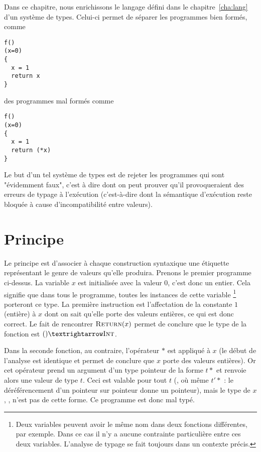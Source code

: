 Dans ce chapitre, nous enrichissons le langage défini dans le
chapitre~\ref{cha:lang} d'un système de types. Celui-ci permet de séparer les
programmes bien formés, comme

\begin{Verbatim}
f()
(x=0)
{
  x = 1
  return x
}
\end{Verbatim}

des programmes mal formés comme

\begin{Verbatim}
f()
(x=0)
{
  x = 1
  return (*x)
}
\end{Verbatim}

Le but d'un tel système de types est de rejeter les programmes qui sont
"évidemment faux", c'est à dire dont on peut prouver qu'il provoqueraient des
erreurs de typage à l'exécution (c'est-à-dire dont la sémantique d'exécution
reste bloquée à cause d'incompatibilité entre valeurs).

\section{Principe}

Le principe est d'associer à chaque construction syntaxique une étiquette
représentant le genre de valeurs qu'elle produira. Prenons le premier programme
ci-dessus. La variable $x$ est initialisée avec la valeur $0$, c'est donc un
entier. Cela signifie que dans tous le programme, toutes les instances de cette
variable
\footnote{Deux variables peuvent avoir le même nom dans deux fonctions
  différentes, par exemple. Dans ce cas il n'y a aucune contrainte particulière
  entre ces deux variables. L'analyse de typage se fait toujours dans un
  contexte précis.
}
porteront ce type. La première instruction est l'affectation de la constante $1$
(entière) à $x$ dont on sait qu'elle porte des valeurs entières, ce qui est donc
correct. Le fait de rencontrer $\textsc{Return}(x)$ permet de conclure que le type de
la fonction est $() → \tInt$.

Dans la seconde fonction, au contraire, l'opérateur $*$ est appliqué à $x$ (le
début de l'analyse est identique et permet de conclure que $x$ porte des valeurs
entières). Or cet opérateur prend un argument d'un type pointeur de la forme
$t*$ et renvoie alors une valeur de type $t$. Ceci est valable pour tout $t$
(\tInt, \tFloat où même $t'*$ : le déréférencement d'un pointeur sur pointeur
donne un pointeur), mais le type de $x$, \tInt, n'est pas de cette forme. Ce
programme est donc mal typé.

